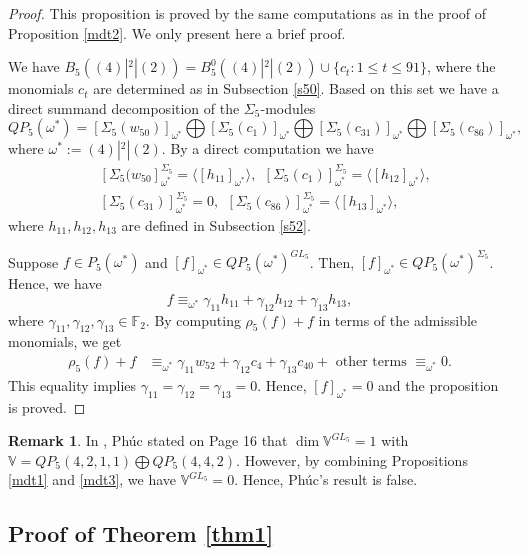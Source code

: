 \documentclass[reqno]{amsart}
\theoremstyle{plain}
\theoremstyle{definition}
\theoremstyle{plain}
\theoremstyle{definition}
\newtheorem{rems}[thms]{Remark}
\numberwithin{equation}{section}
\begin{document}
\begin{proof} This proposition is proved by the same computations as in the proof of Proposition \ref{mdt2}. We only present here a brief proof.
	
\smallskip
We have $B_5((4)|^{2}|(2))= B_5^0((4)|^{2}|(2))\cup\{c_t:1\leqslant t \leqslant 91\}$, where the monomials $c_t$ are determined as in Subsection \ref{s50}. Based on this set we have a direct summand decomposition of the $\Sigma_5$-modules
$$QP_5(\omega^*)= [\Sigma_5(w_{50})]_{\omega^*}\bigoplus[\Sigma_5(c_1)]_{\omega^*}\bigoplus[\Sigma_5(c_{31})]_{\omega^*}\bigoplus[\Sigma_5(c_{86})]_{\omega^*},$$
where $\omega^* := (4)|^{2}|(2)$. By a direct computation we have 
\begin{align*}
&[\Sigma_5(w_{50}]_{\omega^*}^{\Sigma_5} = \langle[h_{11}]_{\omega^*}\rangle,\ \ [\Sigma_5(c_1)]_{\omega^*}^{\Sigma_5} = \langle[h_{12}]_{\omega^*}\rangle,\\ &[\Sigma_5(c_{31})]_{\omega^*}^{\Sigma_5} = 0,\ \
[\Sigma_5(c_{86})]_{\omega^*}^{\Sigma_5} = \langle[h_{13}]_{\omega^*}\rangle,
\end{align*}
where $h_{11}, h_{12}, h_{13}$ are defined in Subsection \ref{s52}. 

Suppose $f \in P_5(\omega^*)$ and $[f]_{\omega^*} \in QP_5(\omega^*)^{GL_5}$. Then, $[f]_{\omega^*} \in QP_5(\omega^*)^{\Sigma_5}$. Hence, we have 
$$f \equiv_{\omega^*} \gamma_{11}h_{11} + \gamma_{12}h_{12} + \gamma_{13}h_{13},$$
where $\gamma_{11}, \gamma_{12}, \gamma_{13} \in \mathbb F_2$. By computing $\rho_5(f)+f$ in terms of the admissible monomials, we get
\begin{align*}
\rho_5(f)+f &\equiv_{\omega^*} \gamma_{11}w_{52} + \gamma_{12}c_4 + \gamma_{13}c_{40} + \mbox{ other terms } \equiv_{\omega^*} 0.
\end{align*}
This equality implies $\gamma_{11} = \gamma_{12} = \gamma_{13} = 0$. Hence, $[f]_{\omega^*} = 0$ and the proposition is proved.
\end{proof}

\begin{rems} In \cite{p24}, Ph\'uc stated on Page 16 that $\dim\mathbb V^{GL_5} = 1$ with $\mathbb V = QP_5(4,2,1,1) \bigoplus QP_5(4,4,2)$. However, by combining Propositions \ref{mdt1} and \ref{mdt3}, we have $\mathbb V^{GL_5} = 0$. Hence, Ph\'uc's result is false.  
\end{rems}


\subsection{Proof of Theorem \ref{thm1}}\
\end{document}
